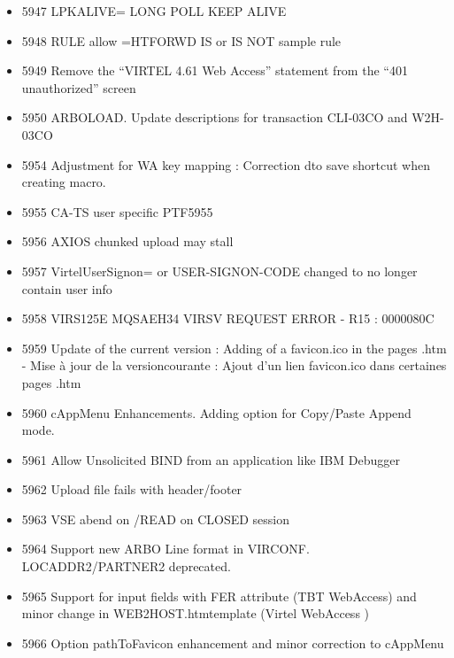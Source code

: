 \documentclass[letterpaper,10pt,english]{sphinxmanual}
\begin{document}
\begin{itemize}
\item {} 
5947 LPKALIVE= LONG POLL KEEP ALIVE

\item {} 
5948 RULE allow =HTFORWD IS or IS NOT sample rule

\item {} 
5949 Remove the “VIRTEL 4.61 Web Access” statement from the “401 unauthorized” screen

\item {} 
5950 ARBOLOAD. Update descriptions for transaction CLI-03CO and W2H-03CO

\item {} 
5954 Adjustment for WA key mapping : Correction dto save shortcut when creating macro.

\item {} 
5955 CA-TS user specific PTF5955

\item {} 
5956 AXIOS chunked upload may stall

\item {} 
5957 VirtelUserSignon= or USER-SIGNON-CODE changed to no longer contain user info

\item {} 
5958 VIRS125E MQSAEH34 VIRSV REQUEST ERROR - R15 : 0000080C

\item {} 
5959 Update of the current version : Adding of a favicon.ico in the pages .htm - Mise à jour de la versioncourante : Ajout d’un lien favicon.ico dans certaines pages .htm

\item {} 
5960 cAppMenu Enhancements. Adding option for Copy/Paste Append mode.

\item {} 
5961 Allow Unsolicited BIND from an application like IBM Debugger

\item {} 
5962 Upload file fails with header/footer

\item {} 
5963 VSE abend on /READ on CLOSED session

\item {} 
5964 Support new ARBO Line format in VIRCONF. LOCADDR2/PARTNER2 deprecated.

\item {} 
5965 Support for input fields with FER attribute (TBT WebAccess) and minor change in WEB2HOST.htmtemplate (Virtel WebAccess )

\item {} 
5966 Option pathToFavicon enhancement and minor correction to cAppMenu


\end{itemize}
\end{document}
